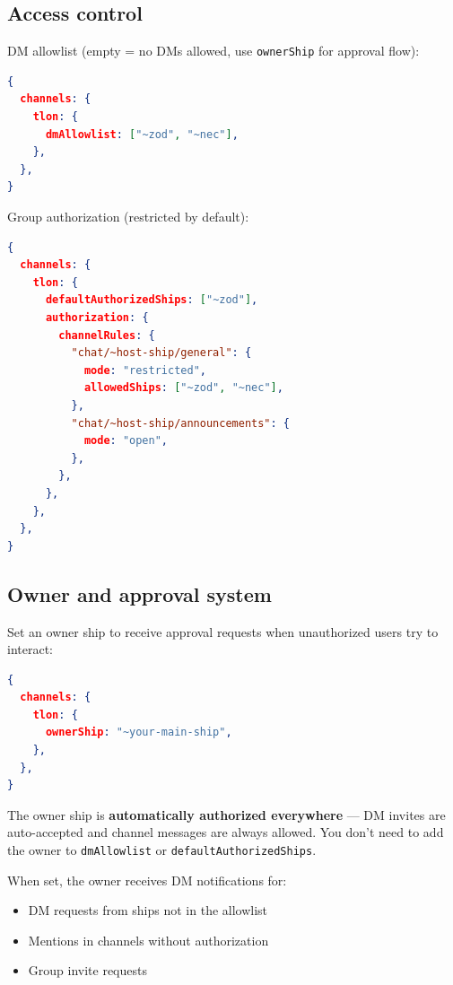 \subsection{Access control}


DM allowlist (empty = no DMs allowed, use \texttt{ownerShip} for approval flow):

\begin{lstlisting}[language=json]
{
  channels: {
    tlon: {
      dmAllowlist: ["~zod", "~nec"],
    },
  },
}
\end{lstlisting}


Group authorization (restricted by default):

\begin{lstlisting}[language=json]
{
  channels: {
    tlon: {
      defaultAuthorizedShips: ["~zod"],
      authorization: {
        channelRules: {
          "chat/~host-ship/general": {
            mode: "restricted",
            allowedShips: ["~zod", "~nec"],
          },
          "chat/~host-ship/announcements": {
            mode: "open",
          },
        },
      },
    },
  },
}
\end{lstlisting}


\subsection{Owner and approval system}


Set an owner ship to receive approval requests when unauthorized users try to interact:

\begin{lstlisting}[language=json]
{
  channels: {
    tlon: {
      ownerShip: "~your-main-ship",
    },
  },
}
\end{lstlisting}


The owner ship is \textbf{automatically authorized everywhere} — DM invites are auto-accepted and
channel messages are always allowed. You don't need to add the owner to \texttt{dmAllowlist} or
\texttt{defaultAuthorizedShips}.

When set, the owner receives DM notifications for:

\begin{itemize}
  \item DM requests from ships not in the allowlist
  \item Mentions in channels without authorization
  \item Group invite requests
\end{itemize}


